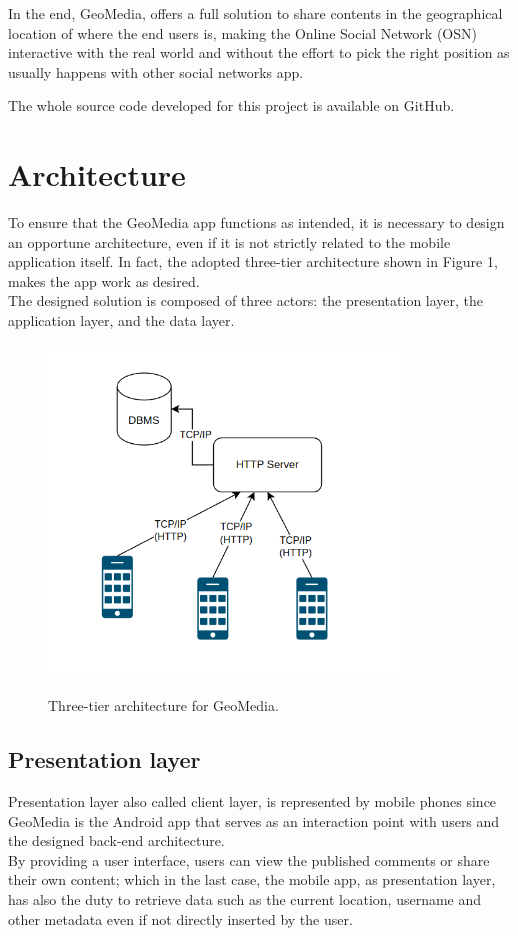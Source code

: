 \documentclass[conference]{IEEEtran}
\begin{document}
In the end, GeoMedia, offers a full solution to share contents in the geographical location of where the end users is, making the Online Social Network (OSN) interactive with the real world and without the effort to pick the right position as usually happens with other social networks app.

The whole source code developed for this project is available on GitHub. \cite{gh}


\section{Architecture}\label{Architecture:panoramic}

To ensure that the GeoMedia app functions as intended, it is necessary to design an opportune architecture, even if it is not strictly related to the mobile application itself.
In fact, the adopted three-tier architecture shown in Figure 1, makes the app work as desired.
\\
The designed solution is composed of three actors: the presentation layer, the application layer, and the data layer.

\begin{figure}[htbp]
{\includegraphics[width=9.5cm]{imgs/Architecture.png}}
\caption{Three-tier architecture for GeoMedia.}
\label{fig}
\end{figure}


\subsection{Presentation layer}
Presentation layer also called client layer, is represented by mobile phones since GeoMedia is the Android app that serves as an interaction point with users and the designed back-end architecture.
\\
By providing a user interface, users can view the published comments or share their own content; which in the last case, the mobile app, as presentation layer, has also the duty to retrieve data such as the current location, username and other metadata even if not directly inserted by the user.
\end{document}
